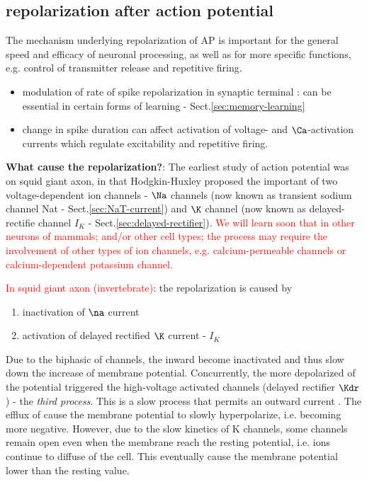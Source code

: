 \subsection{repolarization after action potential}
\label{sec:replarization-AP}
\label{sec:AP-repolarization}

The mechanism underlying repolarization of AP is important for the general speed
and efficacy of neuronal processing, as well as for more specific functions,
e.g. control of transmitter release and repetitive firing.
\begin{itemize}
  \item modulation of rate of spike repolarization in synaptic terminal : can be
  essential in certain forms of learning - Sect.\ref{sec:memory-learning}
  
  \item change in spike duration can affect activation of voltage- and
  $\Ca$-activation currents which regulate excitability and repetitive firing.
\end{itemize}

{\bf What cause the repolarization?}: The earliest study of action potential was
on squid giant axon, in that Hodgkin-Huxley proposed the important of two
voltage-dependent ion channels - $\Na$ channels (now known as transient sodium
channel Nat - Sect.\ref{sec:NaT-current}) and $\K$ channel (now known as
delayed-rectifie channel $I_K$ - Sect.\ref{sec:delayed-rectifier}).
\textcolor{red}{We will learn soon that in other neurons of mammals; and/or
other cell types; the process may require the involvement of other types of ion
channels, e.g. calcium-permeable channels or calcium-dependent potassium
channel.}

\textcolor{red}{In squid giant axon (invertebrate)}: the repolarization is
caused by
\begin{enumerate}
  \item inactivation of $\na$ current
  \item activation of delayed rectified $\K$ current - $I_K$
\end{enumerate}

Due to the biphasic of  channels, the inward  become inactivated
and thus slow down the increase of membrane potential. Concurrently, the more
depolarized of the potential triggered the high-voltage activated 
channels (delayed rectifier $\Kdr$) - the {\it third process}. This is a slow
process that permits an outward current . The efflux of  cause the
membrane potential to slowly hyperpolarize, i.e. becoming more negative.
However, due to the slow kinetics of K channels, some  channels remain
open even when the membrane reach the resting potential, i.e.
 ions continue to diffuse of the cell. This eventually cause the membrane
potential lower than the resting value.

